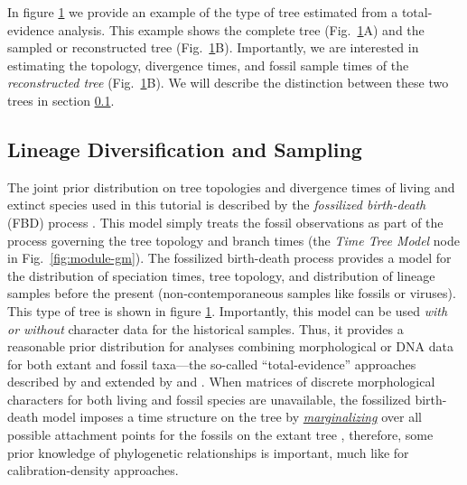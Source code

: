In figure \ref{fig:example-tree} we provide an example of the type of tree estimated from a total-evidence analysis.
This example shows the complete tree (Fig.\ \ref{fig:example-tree}A) and the sampled or reconstructed tree (Fig.\ \ref{fig:example-tree}B). 
Importantly, we are interested in estimating the topology, divergence times, and fossil sample times of the \textit{reconstructed tree} (Fig.\ \ref{fig:example-tree}B). 
We will describe the distinction between these two trees in section \ref{subsect:Intro-FBD}.
\begin{figure}[h!]
\label{fig:example-tree}
\end{figure}


\subsection{Lineage Diversification and Sampling}\label{subsect:Intro-FBD}

The joint prior distribution on tree topologies and divergence times of living and extinct species used in this tutorial is described by the \textit{fossilized birth-death} (FBD) process \citep{Stadler2010, Heath2014}. 
This model simply treats the fossil observations as part of the process governing the tree topology and branch times (the \textit{Time Tree Model} node in Fig.\ \ref{fig:module-gm}). 
The fossilized birth-death process provides a model for the distribution of speciation times, tree topology, and distribution of lineage samples before the present (\EG non-contemporaneous samples like fossils or viruses). 
This type of tree is shown in figure \ref{fig:example-tree}. 
Importantly, this model can be used \textit{with or without} character data for the historical samples. 
Thus, it provides a reasonable prior distribution for analyses combining morphological or DNA data for both extant and fossil taxa---\IE the so-called ``total-evidence'' approaches described by \citet{Ronquist2012a} and extended by \citet{Zhang2016} and \citet{Gavryushkina2016}. 
When matrices of discrete morphological characters for both living and fossil species are unavailable, the fossilized birth-death model imposes a time structure on the tree by \href{https://en.wikipedia.org/wiki/Marginal_distribution}{\textit{marginalizing}} over all possible attachment points for the fossils on the extant tree \citep{Heath2014}, therefore, some prior knowledge of phylogenetic relationships is important, much like for calibration-density approaches.


